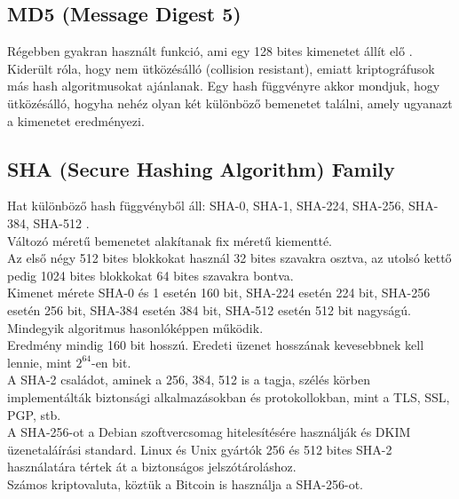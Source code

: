 \subsection{MD5 (Message Digest 5)}
Régebben gyakran használt funkció, ami egy 128 bites kimenetet állít elő \cite{gupta2014review}.
\vspace{5pt} \\Kiderült róla, hogy nem ütközésálló (collision resistant), emiatt kriptográfusok más hash algoritmusokat ajánlanak. Egy hash függvényre akkor mondjuk, hogy ütközésálló, hogyha nehéz olyan két különböző bemenetet találni, amely ugyanazt a kimenetet eredményezi.


\subsection{SHA (Secure Hashing Algorithm) Family}
Hat különböző hash függvényből áll: SHA-0, SHA-1, SHA-224, SHA-256, SHA-384, SHA-512 \cite{dang2008recommendation}.
\vspace{5pt} \\Változó méretű bemenetet alakítanak fix méretű kiementté.
\vspace{5pt} \\Az első négy 512 bites blokkokat használ 32 bites szavakra osztva, az utolsó kettő pedig 1024 bites blokkokat 64 bites szavakra bontva.
\vspace{5pt} \\Kimenet mérete SHA-0 és 1 esetén 160 bit, SHA-224 esetén 224 bit, SHA-256 esetén 256 bit, SHA-384 esetén 384 bit, SHA-512 esetén 512 bit nagyságú.
\vspace{5pt} \\Mindegyik algoritmus hasonlóképpen működik.
\vspace{5pt} \\Eredmény mindig 160 bit hosszú. Eredeti üzenet hosszának kevesebbnek kell lennie, mint $2^{64}$-en bit.
\vspace{5pt} \\A SHA-2 családot, aminek a 256, 384, 512 is a tagja, szélés körben implementálták biztonsági alkalmazásokban és protokollokban, mint a TLS, SSL, PGP, stb.
\vspace{5pt} \\A SHA-256-ot a Debian szoftvercsomag hitelesítésére használják és DKIM üzenetaláírási standard. Linux és Unix gyártók 256 és 512 bites SHA-2 használatára tértek át a biztonságos jelszótároláshoz.
\vspace{5pt} \\Számos kriptovaluta, köztük a Bitcoin is használja a SHA-256-ot.


